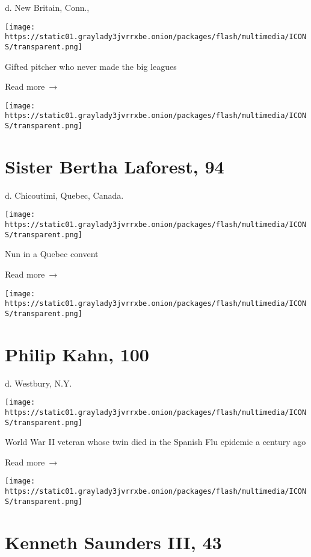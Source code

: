 d. New Britain, Conn.,

\texttt{[image: https://static01.graylady3jvrrxbe.onion/packages/flash/multimedia/ICONS/transparent.png]}

Gifted pitcher who never made the big leagues

 Read more~→

\href{https://www.nytimes3xbfgragh.onion/2020/04/25/obituaries/bertha-laforest-dead-coronavirus.html}{}

\texttt{[image: https://static01.graylady3jvrrxbe.onion/packages/flash/multimedia/ICONS/transparent.png]}

\hypertarget{sister-bertha-laforest-94}{%
\section{Sister Bertha Laforest, 94}\label{sister-bertha-laforest-94}}

d. Chicoutimi, Quebec, Canada.

\texttt{[image: https://static01.graylady3jvrrxbe.onion/packages/flash/multimedia/ICONS/transparent.png]}

Nun in a Quebec convent

 Read more~→

\href{https://www.nytimes3xbfgragh.onion/2020/04/24/nyregion/philip-kahn-dead-coronavirus.html}{}

\texttt{[image: https://static01.graylady3jvrrxbe.onion/packages/flash/multimedia/ICONS/transparent.png]}

\hypertarget{philip-kahn-100}{%
\section{Philip Kahn, 100}\label{philip-kahn-100}}

d. Westbury, N.Y.

\texttt{[image: https://static01.graylady3jvrrxbe.onion/packages/flash/multimedia/ICONS/transparent.png]}

World War II veteran whose twin died in the Spanish Flu epidemic a
century ago

 Read more~→

\href{https://www.nytimes3xbfgragh.onion/2020/04/24/obituaries/kenneth-saunders-dead-coronavirus.html}{}

\texttt{[image: https://static01.graylady3jvrrxbe.onion/packages/flash/multimedia/ICONS/transparent.png]}

\hypertarget{kenneth-saunders-iii-43}{%
\section{Kenneth Saunders III, 43}\label{kenneth-saunders-iii-43}}

